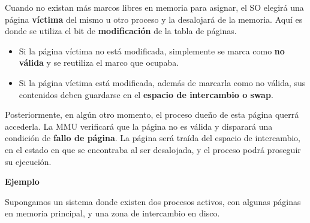 \documentclass[spanish,a4paper,]{article}
\providecommand{\tightlist}{%
  \setlength{\itemsep}{0pt}\setlength{\parskip}{0pt}}
\begin{document}
Cuando no existan más marcos libres en memoria para asignar, el SO
elegirá una página \textbf{víctima} del mismo u otro proceso y la
desalojará de la memoria. Aquí es donde se utiliza el bit de
\textbf{modificación} de la tabla de páginas.

\begin{itemize}
\tightlist
\item
  Si la página víctima no está modificada, simplemente se marca como
  \textbf{no válida} y se reutiliza el marco que ocupaba.
\item
  Si la página víctima está modificada, además de marcarla como no
  válida, sus contenidos deben guardarse en el \textbf{espacio de
  intercambio o swap}.
\end{itemize}

Posteriormente, en algún otro momento, el proceso dueño de esta página
querrá accederla. La MMU verificará que la página no es válida y
disparará una condición de \textbf{fallo de página}. La página será
traída del espacio de intercambio, en el estado en que se encontraba al
ser desalojada, y el proceso podrá proseguir su ejecución.

\textbf{Ejemplo}

Supongamos un sistema donde existen dos procesos activos, con algunas
páginas en memoria principal, y una zona de intercambio en disco.
\end{document}

